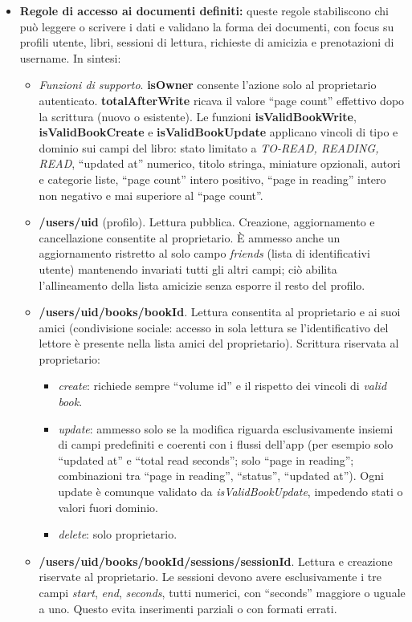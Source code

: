 \documentclass{article}
\begin{document}
\begin{itemize}
\begin{itemize}
    \item \textbf{Regole di accesso ai documenti definiti:} queste regole stabiliscono chi può leggere o scrivere i dati e validano la forma dei documenti, con focus su profili utente, libri, sessioni di lettura, richieste di amicizia e prenotazioni di username. In sintesi:
    \begin{itemize}
    \item \textit{Funzioni di supporto}. \textbf{isOwner} consente l’azione solo al proprietario autenticato. \textbf{totalAfterWrite} ricava il valore “page count” effettivo dopo la scrittura (nuovo o esistente). Le funzioni \textbf{isValidBookWrite}, \textbf{isValidBookCreate} e \textbf{isValidBookUpdate} applicano vincoli di tipo e dominio sui campi del libro: stato limitato a \textit{TO-READ, READING, READ}, “updated at” numerico, titolo stringa, miniature opzionali, autori e categorie liste, “page count” intero positivo, “page in reading” intero non negativo e mai superiore al “page count”.
    \item \textbf{/users/{uid}} (profilo). Lettura pubblica. Creazione, aggiornamento e cancellazione consentite al proprietario. È ammesso anche un aggiornamento ristretto al solo campo \textit{friends} (lista di identificativi utente) mantenendo invariati tutti gli altri campi; ciò abilita l’allineamento della lista amicizie senza esporre il resto del profilo.
    \item \textbf{/users/{uid}/books/{bookId}}. Lettura consentita al proprietario e ai suoi amici (condivisione sociale: accesso in sola lettura se l’identificativo del lettore è presente nella lista amici del proprietario). Scrittura riservata al proprietario:
    \begin{itemize}
    \item \textit{create}: richiede sempre “volume id” e il rispetto dei vincoli di \textit{valid book}.
    \item \textit{update}: ammesso solo se la modifica riguarda esclusivamente insiemi di campi predefiniti e coerenti con i flussi dell’app (per esempio solo “updated at” e “total read seconds”; solo “page in reading”; combinazioni tra “page in reading”, “status”, “updated at”). Ogni update è comunque validato da \textit{isValidBookUpdate}, impedendo stati o valori fuori dominio.
    \item \textit{delete}: solo proprietario.
    \end{itemize}
    \item \textbf{/users/{uid}/books/{bookId}/sessions/{sessionId}}. Lettura e creazione riservate al proprietario. Le sessioni devono avere esclusivamente i tre campi \textit{start}, \textit{end}, \textit{seconds}, tutti numerici, con “seconds” maggiore o uguale a uno. Questo evita inserimenti parziali o con formati errati.

\end{itemize}
\end{itemize}
\end{itemize}
\end{document}

